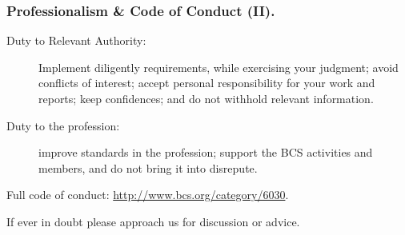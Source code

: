 \documentclass{beamer} %
\begin{document}
\begin{frame}
\frametitle{Professionalism \& Code of Conduct (II).}

\begin{description}
	\item[Duty to Relevant Authority:] Implement diligently requirements, while exercising your judgment; avoid conflicts of interest; accept personal responsibility for your work and reports; keep confidences; and do not withhold relevant information.
	\item[Duty to the profession:] improve standards in the profession; support the BCS activities and members, and do not bring it into disrepute.
\end{description}

\vspace{3mm}
Full code of conduct: \url{http://www.bcs.org/category/6030}.

\vspace{3mm}
If ever in doubt please approach us for discussion or advice.

\end{frame}




\end{document}
